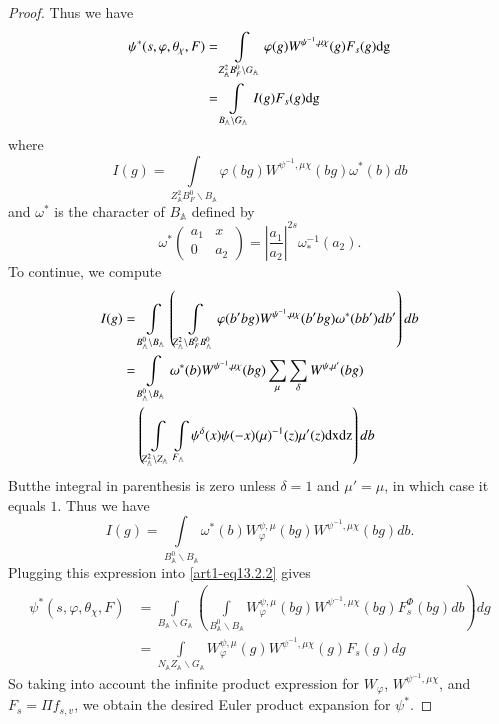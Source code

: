 \begin{proof}
Thus we have
\begin{align}
\psi^{*}(s,\varphi,\theta_{\chi},F) &= \int\limits_{Z^{2}_{\mathbb{A}}B^{0}_{F}\backslash G_{\mathbb{A}}}\varphi(g)W^{\psi^{-1},\mu\chi}(g)F_{s}(g)\mathrm{dg}\notag\\
&= \int\limits_{B_{\mathbb{A}}\backslash G_{\mathbb{A}}}I(g)F_{s}(g)\mathrm{dg}\label{art1-eq13.2.2}
\end{align}
where
$$
I(g)=\int\limits_{Z^{2}_{\mathbb{A}}B^{0}_{F}\backslash B_{\mathbb{A}}}\varphi(bg)W^{\psi^{-1},\mu\chi}(bg)\omega^{*}(b)db
$$
and $\omega^{*}$ is the character of $B_{\mathbb{A}}$ defined by
$$
\omega^{*}\left(\begin{matrix} a_{1} & x\\ 0 & a_{2}\end{matrix}\right)=\left|\frac{a_{1}}{a_{2}}\right|^{2s}\omega^{-1}_{*}(a_{2}).
$$
To continue, we compute
\begin{align*}
I(g) &= \int\limits_{B^{0}_{\mathbb{A}}\backslash B_{\mathbb{A}}} \left(\int\limits_{Z^{2}_{\mathbb{A}}\backslash B^{0}_{F}B^{0}_{\mathbb{A}}}\varphi(b'bg)W^{\psi^{-1},\mu\chi}(b'bg)\omega^{*}(bb')db'\right)db\\
&= \int\limits_{B^{0}_{\mathbb{A}}\backslash B_{\mathbb{A}}}\omega^{*}(b)W^{\psi^{-1},\mu\chi}(bg)\sum\limits_{\mu}\sum\limits_{\delta}W^{\psi,\mu'}(bg)\\
&\quad \left(\int\limits_{Z^{2}_{\mathbb{A}}\backslash Z_{\mathbb{A}}}\int\limits_{F_{\mathbb{A}}}\psi^{\delta}(x)\psi(-x)(\mu)^{-1}(z)\mu'(z)\mathrm{dx}\mathrm{dz}\right)db
\end{align*}
But\pageoriginale the integral in parenthesis is zero unless $\delta=1$ and $\mu'=\mu$, in which case it equals $1$. Thus we have
$$
I(g)=\int\limits_{B^{0}_{\mathbb{A}}\backslash B_{\mathbb{A}}}\omega^{*}(b)W^{\psi,\mu}_{\varphi}(bg)W^{\psi^{-1},\mu\chi}(bg)db.
$$
Plugging this expression into \eqref{art1-eq13.2.2} gives
\begin{align*}
\psi^{*}(s,\varphi,\theta_{\chi},F) &= \int\limits_{B_{\mathbb{A}}\backslash G_{\mathbb{A}}}\left(\int\limits_{B^{0}_{\mathbb{A}}\backslash B_{\mathbb{A}}}W^{\psi,\mu}_{\varphi}(bg)W^{\psi^{-1},\mu\chi}(bg)F^{\Phi}_{s}(bg)db\right)dg\\
&= \int\limits_{N_{\mathbb{A}}Z_{\mathbb{A}}\backslash G_{\mathbb{A}}}W^{\psi,\mu}_{\varphi}(g)W^{\psi^{-1},\mu\chi}(g)F_{s}(g)dg
\end{align*}
So taking into account the infinite product expression for $W_{\varphi}$, $W^{\psi^{-1},\mu\chi}$, and $F_{s}=\Pi f_{s,v}$, we obtain the desired Euler product expansion for $\psi^{*}$.
\end{proof}

